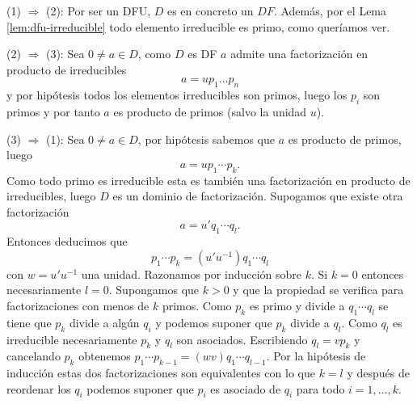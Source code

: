 \begin{proofbox}
(1) $\Rightarrow$ (2): Por ser un DFU, $D$ es en concreto un $DF$. Además, por el Lema \ref{lem:dfu-irreducible} todo elemento irreducible es primo, como queríamos ver.

(2) $\Rightarrow$ (3): Sea $0 \neq a \in D$, como $D$ es DF $a$ admite una factorización en producto de irreducibles
\[
a = u p_1 \dots p_n
\]
y por hipótesis todos los elementos irreducibles son primos, luego los $p_i$ son primos y por tanto $a$ es producto de primos (salvo la unidad $u$).

(3) $\Rightarrow$ (1): Sea $0 \neq a \in D$, por hipótesis sabemos que $a$ es producto de primos, luego
\[
a = u p_1 \cdots p_k.
\]
Como todo primo es irreducible esta es también una factorización en producto de irreducibles, luego $D$ es un dominio de factorización. Supogamos que existe otra factorización
\[
a = u' q_1 \cdots q_l.
\]
Entonces deducimos que 
\[
p_1 \cdots p_k = (u'u^{-1}) q_1 \cdots q_l
\]
con \(w = u'u^{-1}\) una unidad. Razonamos por inducción sobre \(k\). Si \(k = 0\) entonces necesariamente \(l = 0\). Supongamos que \(k > 0\) y que la propiedad se verifica para factorizaciones con menos de \(k\) primos. Como \(p_k\) es primo y divide a \(q_1 \cdots q_l\) se tiene que \(p_k\) divide a algún \(q_i\) y podemos suponer que \(p_k\) divide a \(q_l\). Como \(q_l\) es irreducible necesariamente \(p_k\) y \(q_l\) son asociados. Escribiendo \(q_l = v p_k\) y cancelando \(p_k\) obtenemos \(p_1 \cdots p_{k-1} = (wv) q_1 \cdots q_{l-1}\). Por la hipótesis de inducción estas dos factorizaciones son equivalentes con lo que \(k = l\) y después de reordenar los \(q_i\) podemos suponer que \(p_i\) es asociado de \(q_i\) para todo \(i = 1, \ldots, k\).
\end{proofbox}

